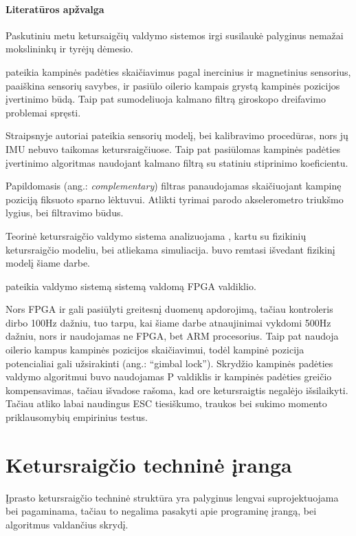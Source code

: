 \documentclass[12pt, a4paper, lithuanian, final]{article}
\begin{document}
\paragraph{Literatūros apžvalga}

Paskutiniu metu ketursaigčių valdymo sistemos irgi susilaukė palyginus nemažai mokslininkų ir tyrėjų dėmesio.

\cite{abyarjoo2015implementing} pateikia kampinės padėties skaičiavimus pagal inercinius ir magnetinius sensorius, paaiškina sensorių savybes, ir pasiūlo oilerio kampais grystą kampinės pozicijos įvertinimo būdą.
Taip pat sumodeliuoja kalmano filtrą giroskopo dreifavimo problemai spręsti.


Straipsnyje \cite{kumar2004estimation} autoriai pateikia sensorių modelį, bei kalibravimo procedūras, nors jų IMU nebuvo taikomas ketursraigčiuose.
Taip pat pasiūlomas kampinės padėties įvertinimo algoritmas naudojant kalmano filtrą su statiniu stiprinimo koeficientu.


Papildomasis (ang.: \textit{complementary}) filtras panaudojamas \cite{euston2008complementary} skaičiuojant kampinę poziciją fiksuoto sparno lėktuvui.
Atlikti tyrimai parodo akselerometro triukšmo lygius, bei filtravimo būdus.

Teorinė ketursraigčio valdymo sistema analizuojama \cite{gibiansky2010quadcopter}, kartu su fizikinių ketursraigčio modeliu, bei atliekama simuliacija.
\cite{gibiansky2010quadcopter} buvo remtasi išvedant fizikinį modelį šiame darbe.

\cite{magnussen2011modeling} pateikia valdymo sistemą sistemą valdomą FPGA valdiklio.

Nors FPGA ir gali pasiūlyti greitesnį duomenų apdorojimą, tačiau \cite{magnussen2011modeling} kontroleris dirbo 100Hz dažniu, tuo tarpu, kai šiame darbe atnaujinimai vykdomi 500Hz dažniu, nors ir naudojamas ne FPGA, bet ARM procesorius.
Taip pat \cite{magnussen2011modeling} naudoja oilerio kampus kampinės pozicijos skaičiavimui, todėl kampinė pozicija potencialiai gali užsirakinti (ang.: "`gimbal lock"').
Skrydžio kampinės padėties valdymo algoritmui buvo naudojamas P valdiklis ir kampinės padėties greičio kompensavimas, tačiau išvadose rašoma, kad ore ketursraigtis negalėjo išsilaikyti.
Tačiau \cite{magnussen2011modeling} atliko labai naudingus ESC tiesiškumo, traukos bei sukimo momento priklausomybių empirinius testus.





\section{Ketursraigčio techninė įranga}
\label{skyr-hardware}
Įprasto ketursraigčio techninė struktūra yra palyginus lengvai suprojektuojama bei pagaminama, tačiau to negalima pasakyti apie programinę įrangą, bei algoritmus valdančius skrydį.
\end{document}
